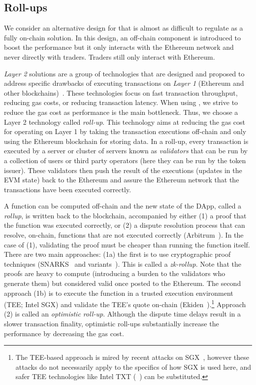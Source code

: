 \subsection{Roll-ups}

We consider an alternative design for \cm that is almost as difficult to regulate as a fully on-chain solution. In this design, an off-chain component is introduced to boost the performance but it only interacts with the Ethereum network and never directly with traders. Traders still only interact with Ethereum.



\textit{Layer 2} solutions are a group of technologies that are designed and proposed to address specific drawbacks of executing transactions on \textit{Layer 1} (\ie Ethereum and other blockchains)~\cite{gudgeon2020sok}. These technologies focus on fast transaction throughput, reducing gas costs, or reducing transaction latency. When using \cm, we strive to reduce the gas cost as performance is the main bottleneck. Thus, we choose a Layer 2 technology called \textit{roll-up}. This technology aims at reducing the gas cost for operating on Layer 1 by taking the transaction executions off-chain and only using the Ethereum blockchain for storing data. In a roll-up, every transaction is executed by a server or cluster of servers known as \textit{validators} that can be run by a collection of users or third party operators (here they can be run by the token issuer). These validators then push the result of the executions (\ie updates in the EVM state) back to the Ethereum and assure the Ethereum network that the transactions have been executed correctly.

A function can be computed off-chain and the new state of the DApp, called a \textit{rollup}, is written back to the blockchain, accompanied by either (1) a proof that the function was executed correctly, or (2) a dispute resolution process that can resolve, on-chain, functions that are not executed correctly (\eg Arbitrum~\cite{kalodner2018arbitrum}). In the case of (1), validating the proof must be cheaper than running the function itself. There are two main approaches: (1a) the first is to use cryptographic proof techniques (\eg SNARKS~\cite{BCGTV13,GGPR13} and variants~\cite{BBHR19}). This is called a \textit{zk-rollup}. Note that the proofs are heavy to compute (introducing a burden to the validators who generate them) but considered valid once posted to the Ethereum. The second approach (1b) is to execute the function in a trusted execution environment (TEE; \eg Intel SGX) and validate the TEE's quote on-chain (\eg Ekiden~\cite{cheng2019ekiden}).\footnote{The TEE-based approach is mired by recent attacks on SGX~\cite{SGX1,SGX2,SGX3,SGX4}, however these attacks do not necessarily apply to the specifics of how SGX is used here, and safer TEE technologies like Intel TXT (\cf~\cite{ZBC+19}) can be substituted.} Approach (2) is called an \textit{optimistic roll-up}. Although the dispute time delays result in a slower transaction finality, optimistic roll-ups substantially increase the performance by decreasing the gas cost.

